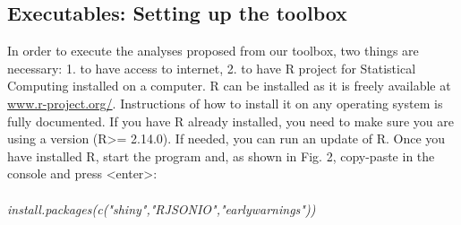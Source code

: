 \documentclass[12pt,a4paper,final]{article}
\begin{document}
\begin{doublespacing}
\section{Executables: Setting up the toolbox}
In order to execute the analyses proposed from our toolbox, two things are necessary:
1. to have access to internet,
2. to have R project for Statistical Computing installed on a computer.
R can be installed as it is freely available at \url{www.r-project.org/}. Instructions of how to install it on any operating system is fully documented. If you have R already installed, you need to make sure you are using a version (R>= 2.14.0). If needed, you can run an update of R.
Once you have installed R, start the program and, as shown in Fig. 2, copy-paste in the console and press <enter>:\\
\\
\textit{%
install.packages(c("shiny","RJSONIO","earlywarnings"))}\\
\begin{figure}[ht]
\begin{center}

\end{center}
\end{figure}
\end{doublespacing}
\end{document}
